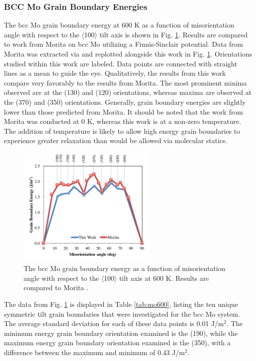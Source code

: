 \documentclass[review]{elsarticle}
\begin{document}
\subsubsection{BCC Mo Grain Boundary Energies}

The bcc Mo grain boundary energy at 600 K as a function of misorientation angle with respect to the $\langle$100$\rangle$ tilt axis is shown in Fig. \ref{fig:mo600}. Results are compared to work from Morita \cite{morita1997} on bcc Mo utilizing a Finnis-Sinclair \cite{finnis} potential. Data from Morita \cite{morita1997} was extracted via \cite{webplot} and replotted alongside this work in Fig. \ref{fig:mo600}. Orientations studied within this work are labeled. Data points are connected with straight lines as a mean to guide the eye. Qualitatively, the results from this work compare very favorably to the results from Morita. The most prominent minima observed are at the (130) and (120) orientations, whereas maxima are observed at the (370) and (350) orientations. Generally, grain boundary energies are slightly lower than those predicted from Morita. It should be noted that the work from Morita was conducted at 0 K, whereas this work is at a non-zero temperature. The addition of temperature is likely to allow high energy grain boundaries to experience greater relaxation than would be allowed via molecular statics. 

\begin{figure}[h]
 \centering
 \includegraphics[width=0.6\textwidth]{mo600A.png} 
 \caption{The bcc Mo grain boundary energy as a function of misorientation angle with respect to the $\langle$100$\rangle$ tilt axis at 600 K. Results are compared to Morita \cite{morita1997}.}
 \label{fig:mo600}
\end{figure}

\FloatBarrier

The data from Fig. \ref{fig:mo600} is displayed in Table \ref{tab:mo600}, listing the ten unique symmetric tilt grain boundaries that were investigated for the bcc Mo system. The average standard deviation for each of these data points is 0.01 J/m$^{2}$. The minimum energy grain boundary orientation examined is the (190), while the maximum energy grain boundary orientation examined is the (350), with a difference between the maximum and minimum of 0.43 J/m$^{2}$.
\end{document}
